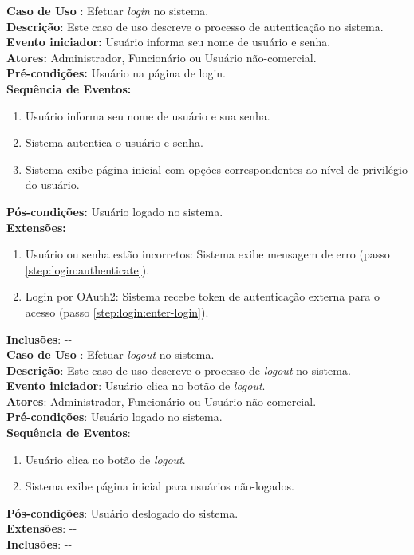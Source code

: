 \documentclass[]{politex}
\begin{document}
\noindent \textbf{Caso de Uso }: Efetuar \textit{login} no sistema. \\
\textbf{Descrição}: Este caso de uso descreve o processo de autenticação no sistema. \\
\textbf{Evento iniciador:} Usuário informa seu nome de usuário e senha. \\
\textbf{Atores:} Administrador, Funcionário ou Usuário não-comercial. \\
\textbf{Pré-condições:} Usuário na página de login. \\
\textbf{Sequência de Eventos:}
\begin{enumerate}
\item\label{step:login:enter-login} Usuário informa seu nome de usuário e sua senha.
\item\label{step:login:authenticate} Sistema autentica o usuário e senha.
\item Sistema exibe página inicial com opções correspondentes ao nível de privilégio do usuário.
\end{enumerate}
\textbf{Pós-condições:} Usuário logado no sistema. \\
\textbf{Extensões:}
\begin{enumerate}
\item Usuário ou senha estão incorretos: Sistema exibe mensagem de erro (passo \ref{step:login:authenticate}).
\item Login por OAuth2: Sistema recebe token de autenticação externa para o acesso (passo \ref{step:login:enter-login}).
\end{enumerate}
\textbf{Inclusões}: -{}- \\

\noindent \textbf{Caso de Uso }: Efetuar \textit{logout} no sistema. \\
\textbf{Descrição}: Este caso de uso descreve o processo de \textit{logout} no sistema. \\
\textbf{Evento iniciador}: Usuário clica no botão de \textit{logout}. \\
\textbf{Atores}: Administrador, Funcionário ou Usuário não-comercial. \\
\textbf{Pré-condições}: Usuário logado no sistema. \\
\textbf{Sequência de Eventos}:
\begin{enumerate}
\item Usuário clica no botão de \textit{logout}.
\item Sistema exibe página inicial para usuários não-logados.
\end{enumerate}
\textbf{Pós-condições}: Usuário deslogado do sistema. \\
\textbf{Extensões}: -{}- \\
\textbf{Inclusões}: -{}- \\
\end{document}
